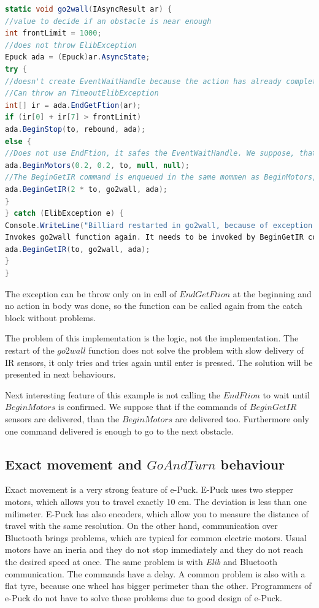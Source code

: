 \begin{lstlisting}[language=cs]
static void go2wall(IAsyncResult ar) {
//value to decide if an obstacle is near enough
int frontLimit = 1000;  
//does not throw ElibException
Epuck ada = (Epuck)ar.AsyncState;
try {
//doesn't create EventWaitHandle because the action has already completed synchronously.
//Can throw an TimeoutElibException
int[] ir = ada.EndGetFtion(ar);    
if (ir[0] + ir[7] > frontLimit)
ada.BeginStop(to, rebound, ada);
else {
//Does not use EndFtion, it safes the EventWaitHandle. We suppose, that it succeeds now or in next rounds.
ada.BeginMotors(0.2, 0.2, to, null, null);
//The BeginGetIR command is enqueued in the same mommen as BeginMotors, therefor 2*to.
ada.BeginGetIR(2 * to, go2wall, ada);
}
} catch (ElibException e) {
Console.WriteLine("Billiard restarted in go2wall, because of exception:\n" + e.Message);
Invokes go2wall function again. It needs to be invoked by BeginGetIR command, because it expects ar with IR values.
ada.BeginGetIR(to, go2wall, ada);
}
}
\end{lstlisting}
  The exception can be throw only on in call of $EndGetFtion$ at the beginning and 
  no action in body was done, so the function can be called again from the catch block without problems.

  The problem of this implementation is the logic, not the implementation. 
  The restart of the $go2wall$ function does not solve the problem with 
  slow delivery of IR sensors, it only tries and tries again until enter is pressed.
  The solution will be presented in next behaviours.

  Next interesting feature of this example is not calling the $EndFtion$ to wait until $BeginMotors$ is confirmed.
  We suppose that if the commands of $BeginGetIR$ sensors are delivered, than the $BeginMotors$ are delivered too.
  Furthermore only one command delivered is enough to go to the next obstacle.

\subsection{Exact movement and $GoAndTurn$ behaviour} \label{sec:go}
  Exact movement is a very strong feature of e-Puck. E-Puck uses two stepper motors,
  which allows you to travel exactly 10 cm. The deviation is less than one milimeter.
  E-Puck has also encoders, which allow you to measure the distance of travel with the same resolution.
  On the other hand, communication over Bluetooth brings problems, which are typical for common electric motors.
  Usual motors have an ineria and they do not stop immediately and they do not reach the desired speed at once. The same problem is with 
  {\it Elib} and Bluetooth communication. The commands have a delay.
  A common problem is also with a flat tyre, because one wheel has bigger perimeter than the other.
  Programmers of e-Puck do not have to solve these problems due to good design of e-Puck.

